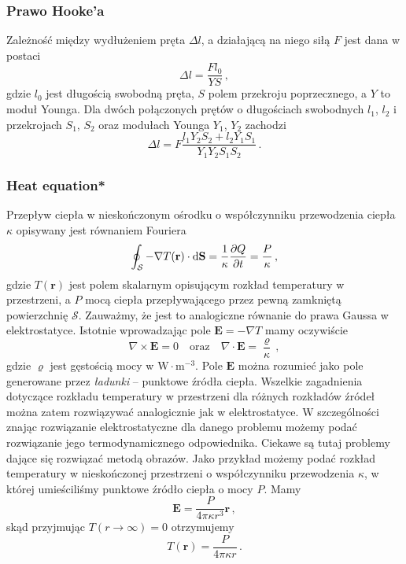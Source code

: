 \documentclass[../main.tex]{subfiles}
\begin{document}
 \subsubsection{Prawo Hooke'a}
 Zależność między wydłużeniem pręta \(\Delta l\), a działającą na niego siłą \(F\) jest dana w postaci
 \begin{equation*}
     \Delta l =\frac{Fl_0}{YS}\,,
 \end{equation*}
 gdzie \(l_0\) jest długością swobodną pręta, \(S\) polem przekroju poprzecznego, a \(Y\) to moduł Younga. Dla dwóch połączonych prętów o długościach swobodnych \(l_1\), \(l_2\) i przekrojach \(S_1\), \(S_2\) oraz modułach Younga \(Y_1\), \(Y_2\) zachodzi
 \begin{equation*}
     \Delta l=F\frac{l_1Y_2S_2+l_2Y_1S_1}{Y_1Y_2S_1S_2}\,.
 \end{equation*}
\subsubsection{Heat equation*}
Przepływ ciepła w nieskończonym ośrodku o współczynniku przewodzenia ciepła \(\kappa\) opisywany jest równaniem Fouriera
\begin{equation*}
    \oint_\mathcal{S}-\nabla T(\mathbf{r})\cdot \dd{\mathbf{S}}=\frac{1}{\kappa}\pdv{Q}{t}=\frac{P}{\kappa}\,,
\end{equation*}
gdzie \(T(\mathbf{r})\) jest polem skalarnym opisującym rozkład temperatury w przestrzeni, a \(P\) mocą ciepła przepływającego przez pewną zamkniętą powierzchnię \(\mathcal{S}\). Zauważmy, że jest to analogiczne równanie do prawa Gaussa w elektrostatyce. Istotnie wprowadzając pole \(\mathbf{E}=-\nabla T\) mamy oczywiście
\begin{equation*}
    \nabla\times \mathbf{E}=0\quad\text{oraz}\quad \nabla\cdot \mathbf{E}=\frac{\varrho}{\kappa}\,,
\end{equation*}
gdzie \(\varrho\) jest gęstością mocy w \(\text{W}\cdot\text{m}^{-3}\). Pole \(\mathbf{E}\) można rozumieć jako pole generowane przez \textit{ładunki} -- punktowe źródła ciepła. Wszelkie zagadnienia dotyczące rozkładu temperatury w przestrzeni dla różnych rozkładów źródeł można zatem rozwiązywać analogicznie jak w elektrostatyce. W szczególności znając rozwiązanie elektrostatyczne dla danego problemu możemy podać rozwiązanie jego termodynamicznego odpowiednika. Ciekawe są tutaj problemy dające się rozwiązać metodą obrazów. Jako przykład możemy podać rozkład temperatury w nieskończonej przestrzeni o współczynniku przewodzenia \(\kappa\), w której umieściliśmy punktowe źródło ciepła o mocy \(P\). Mamy
\begin{equation*}
    \mathbf{E}=\frac{P}{4\pi\kappa r^3}\mathbf{r}\,,
\end{equation*}
skąd przyjmując \(T(r\to\infty)=0\) otrzymujemy
\begin{equation*}
    T(\mathbf{r})=\frac{P}{4\pi\kappa r}\,.
\end{equation*}
\end{document}

